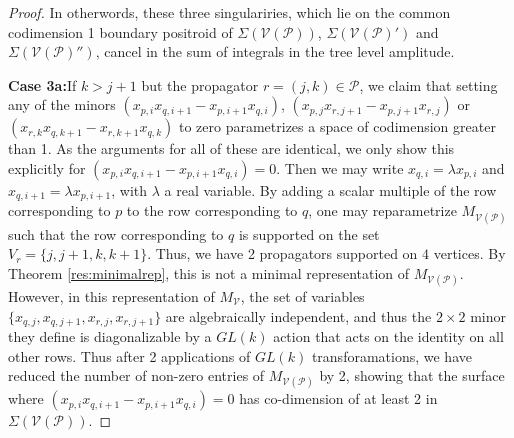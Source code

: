 \documentclass[11pt]{article}
\newcommand{\drawWLD}[2]{

\pgfmathsetmacro{\n}{#1}
\pgfmathsetmacro{\radius}{#2}
\pgfmathsetmacro{\angle}{360/\n}
\draw (0,0) circle (\radius);
    \foreach \i in {1,2,...,\n} {
      \draw (\angle*\i:\radius) node {$\bullet$};
    }

}
\newcommand{\drawprop}[4]{
\pgfmathsetmacro{\r}{#1}
\pgfmathsetmacro{\bumpr}{#2}
\pgfmathsetmacro{\s}{#3}
\pgfmathsetmacro{\bumps}{#4}
\pgfmathsetmacro{\perturbe}{\angle/\n}
\begin{scope}
\draw[smallpropagator] (\angle*\r + \angle/2 + \bumpr*\perturbe:\radius) -- (\angle*\s + \angle/2 + \bumps*\perturbe:\radius);
\end{scope}
}
\newcommand{\modifiedprop}[5]{
\pgfmathsetmacro{\r}{#1}
\pgfmathsetmacro{\bumpr}{#2}
\pgfmathsetmacro{\s}{#3}
\pgfmathsetmacro{\bumps}{#4}
\pgfmathsetmacro{\perturbe}{\angle/\n}

\begin{scope}
\clip (\angle*\r:\radius) -- (\angle + \angle*\r:\radius) -- (\angle*\s:\radius) -- (\angle + \angle*\s:\radius) -- (\angle*\r:\radius);
\draw[#5] (\angle*\r + \angle/2 + \bumpr*\perturbe:\radius) -- (\angle*\s + \angle/2 + \bumps*\perturbe:\radius);
\end{scope}
}
\newcommand{\drawnumbers}{
  \foreach \i in {1,2,...,\n} {
  \pgfmathsetmacro{\x}{\angle*\i}
  \draw (\x:\radius*1.25) node {\footnotesize \i};
}
}
\newcommand{\cP}{\mathcal{P}}
\newcommand{\cV}{\mathcal{V}}
\newcommand{\VP}{\cV(\cP)}
\theoremstyle{remark}
\theoremstyle{definition}
\begin{document}
\begin{proof}
\begin{comment}
        \drawprop{5}{0}{8}{-1}
		\end{scope}
	\end{tikzpicture} \leftrightarrow \begin{tikzpicture}[rotate=67.5,baseline=(current bounding box.east)]
	\begin{scope}
	\drawWLD{10}{1.5}
	\drawnumbers
	\modifiedprop{1}{0}{8}{1}{propagator, dashed}
	\modifiedprop{1}{0}{3}{0}{propagator, dashed}
        \drawprop{5}{0}{8}{-1}
		\end{scope}
	\end{tikzpicture} \leftrightarrow \begin{tikzpicture}[rotate=67.5,baseline=(current bounding box.east)]
	\begin{scope}
	\drawWLD{10}{1.5}
	\drawnumbers
	\modifiedprop{1}{0}{3}{0}{propagator, dashed}
	\modifiedprop{3}{0}{8}{0}{propagator, dashed}
        \drawprop{5}{0}{8}{-1}
		\end{scope}
	\end{tikzpicture}\eas \end{comment}
In otherwords, these three singulariries, which lie on the common codimension 1 boundary positroid of $\Sigma(\VP)$, $\Sigma(\VP')$ and $\Sigma(\VP'')$, cancel in the sum of integrals in the tree level amplitude.

\textbf{Case 3a:}If $k > j+1$ but the propagator $r =  (j,k) \in \cP$, we claim that setting any of the minors $(x_{p,i}x_{q,i+1} -x_{p,i+1}x_{q,i})$, $(x_{p,j}x_{r,j+1} -x_{p,j+1}x_{r,j})$ or $(x_{r,k}x_{q,k+1} -x_{r,k+1}x_{q,k})$ to zero parametrizes a space of codimension greater than 1. As the arguments for all of these are identical, we only show this explicitly for $(x_{p,i}x_{q,i+1} -x_{p,i+1}x_{q,i}) = 0$. Then we may write $x_{q, i} = \lambda x_{p, i}$ and $x_{q, i+1} = \lambda x_{p, i+1}$, with $\lambda$ a real variable. By adding a scalar multiple of the row corresponding to $p$ to the row corresponding to $q$, one may reparametrize $M_{\VP}$ such that the row corresponding to $q$ is supported on the set $V_r =\{j, j+1, k, k+1\}$. Thus, we have 2 propagators supported on $4$ vertices. By Theorem \ref{res:minimalrep}, this is not a minimal representation of $M_{\VP}$. However, in this representation of $M_{\cV}$, the set of variables $\{x_{q, j}, x_{q, j+ 1}, x_{r, j}, x_{r, j+1}\}$ are algebraically independent, and thus the $2 \times 2$ minor they define is diagonalizable by a $GL(k)$ action that acts on the identity on all other rows. Thus after 2 applications of $GL(k)$ transforamations, we have reduced the number of non-zero entries of $M_{\VP}$ by 2, showing that the surface where $(x_{p,i}x_{q,i+1} -x_{p,i+1}x_{q,i}) = 0$ has co-dimension of at least 2 in $\Sigma(\VP)$. 


\end{proof}
\end{document}

